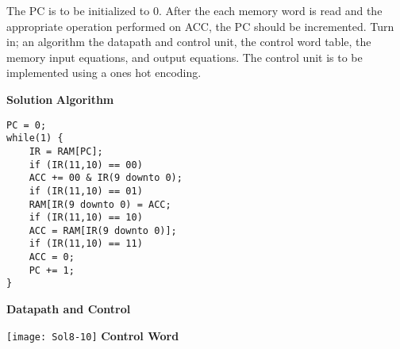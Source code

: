 \begin{enumerate}
        The PC is to be initialized to 0.  After the each memory word is read
        and the appropriate operation performed on ACC, the PC should be
        incremented.
        Turn in; an algorithm the datapath and control unit, the control word
        table, the memory input equations, and output equations.
        The control unit is to be implemented using a ones hot encoding.

        \begin{onlysolution}[fragile]  \textbf{Solution}
            \textbf{ Algorithm}
              \begin{verbatim}
PC = 0;
while(1) {
    IR = RAM[PC];
    if (IR(11,10) == 00)
    ACC += 00 & IR(9 downto 0);
    if (IR(11,10) == 01)
    RAM[IR(9 downto 0) = ACC;
    if (IR(11,10) == 10)
    ACC = RAM[IR(9 downto 0)];
    if (IR(11,10) == 11)
    ACC = 0;
    PC += 1;
}
\end{verbatim}
            \filbreak
            \textbf{Datapath and Control}\par
            \texttt{[image: Sol8-10]}
            \textbf{Control Word}\vspace{0.5em}


\end{onlysolution}
\end{enumerate}
